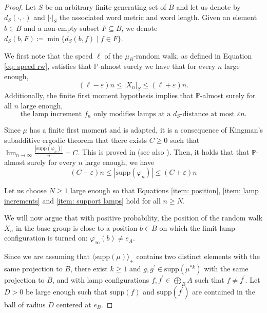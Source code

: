 \documentclass[reqno,oneside,11pt]{amsart}
\renewcommand{\P}{\mathbb{P}}
\newcommand{\supp}[1]{\mathrm{supp}(#1)}
\theoremstyle{plain}
\theoremstyle{definition}
\begin{document}
\begin{proof}
	Let $S$ be an arbitrary finite generating set of $B$ and let us denote by $d_S(\cdot,\cdot)$ and $|\cdot|_S$ the associated word metric and word length. Given an element $b\in B$ and a non-empty subset $F\subseteq B$, we denote $d_S(b,F)\coloneqq \min\{d_S(b,f)\mid f\in F\}$.
	
	We first note that the speed $\ell$ of the $\mu_B$-random walk, as defined in Equation \eqref{eq: speed rw}, satisfies that $\P$-almost surely we have that for every $n$ large enough,
	\begin{equation}\label{item: position}
		(\ell-\varepsilon) n\le |X_n|_S\le (\ell +\varepsilon)n.
	\end{equation} 
	Additionally, the finite first moment hypothesis implies that $\P$-almost surely for all $n$ large enough,
	\begin{equation}\label{item: lamp increments}
		\text{the lamp increment }f_{n} \text{ only modifies lamps at a }d_S\text{-distance at most }\varepsilon n.
	\end{equation}
	
	Since $\mu$ has a finite first moment and is adapted, it is a consequence of Kingman's subadditive ergodic theorem that there exists $C\ge 0$ such that
\( 
\lim_{n\to \infty}\frac{|\supp{\varphi_n}|}{n}=C.
\)
This is proved in \cite[Lemma 2.1]{Erschler2011} (see also \cite[Theorem 3.1]{Gilch2008}).
Then, it holds that that $\P$-almost surely for every $n$ large enough, we have
	\begin{equation} \label{item: support lamps}
		(C-\varepsilon)n\le |\supp{\varphi_n}|\le (C+\varepsilon)n
	\end{equation}
	
	
	Let us choose $N\ge 1$ large enough so that Equations \eqref{item: position}, \eqref{item: lamp increments} and \eqref{item: support lamps} hold for all $n\ge N$. 
	
	We will now argue that with positive probability, the position of the random walk $X_n$ in the base group is close to a position $b\in B$ on which the limit lamp configuration is turned on: $\varphi_{\infty}(b)\neq e_A$. 
	
	Since we are assuming that $\langle\supp{\mu}\rangle_{+}$ contains two distinct elements with the same projection to $B$, there exist $k\ge 1$ and $g,g^{\prime } \in \supp{\mu^{*k}}$ with the same projection to $B$, and with lamp configurations $f,f^\prime\in \bigoplus_{B}A$ such that $f\neq f^{\prime}$. Let $D>0$ be large enough such that $\supp{f}$ and $\supp{f^{\prime}}$ are contained in the ball of radius $D$ centered at $e_B$. 
	

\end{proof}
\end{document}
